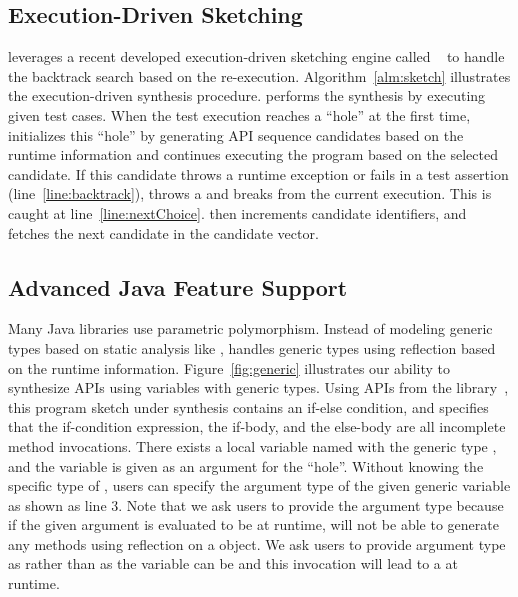  
\subsection{Execution-Driven Sketching}\label{sec:backtrack}

\tool leverages a recent developed execution-driven sketching engine called \sj~\cite{sketch4j:spin17}  to handle the backtrack search based on the re-execution. 
Algorithm~\ref{alm:sketch} illustrates the execution-driven synthesis procedure.  \tool performs the synthesis by executing given test cases. When the test execution reaches a ``hole'' at the first time, \tool initializes this ``hole'' by generating API sequence candidates based on the runtime information and continues executing the program based on the selected candidate. If this candidate throws a runtime exception or fails in a test assertion (line~\ref{line:backtrack}), \tool throws a  and breaks from the current execution. This  is caught at line~\ref{line:nextChoice}. \tool then increments candidate identifiers, and fetches the next candidate in the candidate vector. 


\subsection{Advanced Java Feature Support}

  Many Java libraries use parametric polymorphism.  Instead of  modeling generic types based on static analysis like \spt, \tool handles generic types using reflection based on the runtime information. Figure~\ref{fig:generic} illustrates our ability to synthesize APIs using variables with generic types. Using APIs from the  library~\cite{closure}, this program sketch under synthesis contains an if-else condition, and specifies that the if-condition expression, the if-body, and the else-body are all incomplete method invocations. There exists a  local variable named   with the generic type , and the variable is given as an argument for the ``hole''. Without knowing the specific type of , users can specify the argument type of the given generic variable as  shown as line 3. 
  Note that we ask users to provide the argument type because if the given argument is evaluated to be  at runtime, \tool will not be able to generate any methods using reflection on a  object. We ask users to provide argument type as  rather than  as the variable  can be  and this invocation will lead to a  at runtime.  
  

